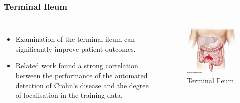 \documentclass{beamer}
\begin{document}
\begin{frame}
	\frametitle{Terminal Ileum}
	\begin{columns}[c] %
		\begin{itemize}
			
			\item Examination of the terminal ileum can significantly improve patient outcomes.

			\item Related work found a strong correlation between the performance of the automated detection of Crohn's disease and the degree of localisation in the training data. 
			\end{itemize}
		
		\begin{figure}[htp]
			\centering
			\includegraphics[width=\textwidth]{../figures/crohn's_ileitis-350x328.png}
			\caption{Terminal Ileum}
			\label{fig:terminal-ileum}
		\end{figure}
		
		\end{columns}
\end{frame}
\end{document}
